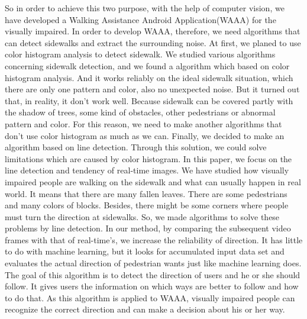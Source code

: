\newline
So in order to achieve this two purpose, with the help of computer vision, we have developed a Walking Assistance Android Application(WAAA) for the visually impaired. In order to develop WAAA, therefore, we need algorithms that can detect sidewalks and extract the surrounding noise. At first, we planed to use color histogram analysis to detect sidewalk. We studied various algorithms concerning sidewalk detection, and we found a algorithm which based on color histogram analysis. And it works reliably on the ideal sidewalk situation, which there are only one pattern and color, also no unexpected noise. But it turned out that, in reality, it don’t work well. Because sidewalk can be covered partly with the shadow of trees, some kind of obstacles, other pedestrians or abnormal pattern and color. For this reason, we need to make another algorithms that don’t use color histogram as much as we can. Finally, we decided to make an algorithm based on line detection. Through this solution, we could solve limitations which are caused by color histogram.
\newline
In this paper, we focus on the line detection and tendency of real-time images. We have studied how visually impaired people are walking on the sidewalk and what can usually happen in real world. It means that there are many fallen leaves. There are some pedestrians and many colors of blocks. Besides, there might be some corners where people must turn the direction at sidewalks. So, we made algorithms to solve these problems by line detection.
\newline
In our method, by comparing the subsequent video frames with that of real-time's, we increase the reliability of direction. It has little to do with machine learning, but it looks for accumulated input data set and evaluates the actual direction of pedestrian wants just like machine learning does. The goal of this algorithm is to detect the direction of users and he or she should follow. It gives users the information on which ways are better to follow and how to do that. As this algorithm is applied to WAAA, visually impaired people can recognize the correct direction and can make a decision about his or her way.